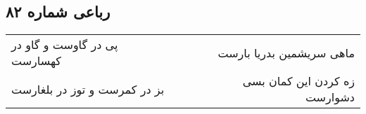 \begin{center}
\section*{رباعی شماره ۸۲}
\label{sec:sh082}
\begin{longtable}{l p{0.5cm} r}
پی در گاوست و گاو در کهسارست
&&
ماهی سریشمین بدریا بارست
\\
بز در کمرست و توز در بلغارست
&&
زه کردن این کمان بسی دشوارست
\\
\end{longtable}
\end{center}
